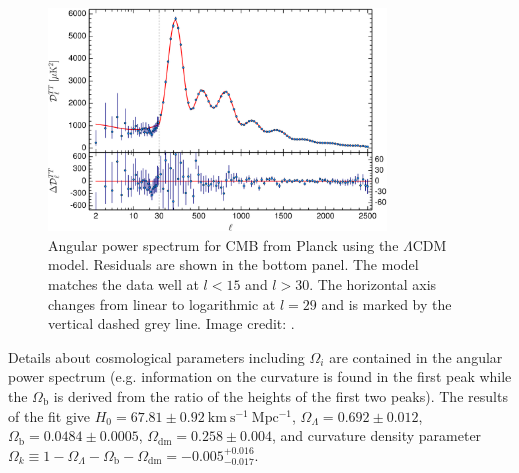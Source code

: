\begin{figure}
	\includegraphics[width=0.8\textwidth]{cmb_power_spectrum}
	\centering
	\caption{Angular power spectrum for CMB from Planck using the $\Lambda$CDM model.  Residuals
	are shown in the bottom panel.  The model matches the data well at $l < 15$ and $l > 30$.  The horizontal axis changes from linear to
	logarithmic at $l = 29$ and is marked by the vertical dashed grey
	line. Image credit: .}
	\label{fig:cmb_power_spectrum}
\end{figure}

Details about cosmological parameters including $\Omega_i$ are contained in the angular power spectrum (e.g. information on the curvature
is found in the first peak while the $\Omega_{\mathrm{b}}$ is derived from the ratio of the heights of the first two peaks).  The results
of the fit give $H_{0} = 67.81 \pm 0.92\ \mathrm{km\ s^{-1}\ Mpc^{-1}}$, $\Omega_{\Lambda} = 0.692 \pm 0.012$,
$\Omega_{\mathrm{b}} = 0.0484 \pm 0.0005$, $\Omega_{\mathrm{dm}} = 0.258 \pm 0.004$, and curvature density parameter
$\Omega_{k} \equiv 1 - \Omega_{\Lambda} - \Omega_{\mathrm{b}} - \Omega_{\mathrm{dm}} =  -0.005_{-0.017}^{+0.016}$.







